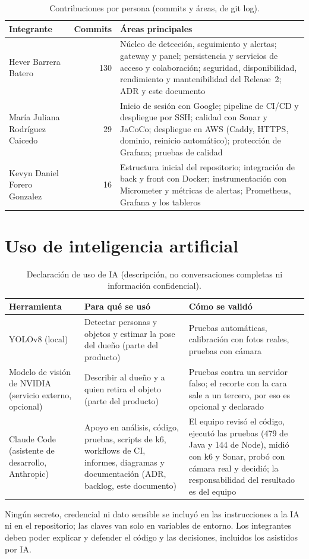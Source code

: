 \begin{table}[H]
\centering\small
\caption{Contribuciones por persona (commits y áreas, de git log).}\label{tab:contribuciones}
\begin{tabularx}{\textwidth}{lrY}
\toprule
\textbf{Integrante} & \textbf{Commits} & \textbf{Áreas principales} \\
\midrule
Hever Barrera Batero & 130 & Núcleo de detección, seguimiento y alertas; gateway y panel; persistencia y servicios de acceso y colaboración; seguridad, disponibilidad, rendimiento y mantenibilidad del Release~2; ADR y este documento \\
María Juliana Rodríguez Caicedo & 29 & Inicio de sesión con Google; pipeline de CI/CD y despliegue por SSH; calidad con Sonar y JaCoCo; despliegue en AWS (Caddy, HTTPS, dominio, reinicio automático); protección de Grafana; pruebas de calidad \\
Kevyn Daniel Forero Gonzalez & 16 & Estructura inicial del repositorio; integración de back y front con Docker; instrumentación con Micrometer y métricas de alertas; Prometheus, Grafana y los tableros \\
\bottomrule
\end{tabularx}
\end{table}

\section{Uso de inteligencia artificial}
\begin{table}[H]
\centering\small
\caption{Declaración de uso de IA (descripción, no conversaciones completas ni información confidencial).}\label{tab:ia}
\begin{tabularx}{\textwidth}{lYY}
\toprule
\textbf{Herramienta} & \textbf{Para qué se usó} & \textbf{Cómo se validó} \\
\midrule
YOLOv8 (local) & Detectar personas y objetos y estimar la pose del dueño (parte del producto) & Pruebas automáticas, calibración con fotos reales, pruebas con cámara \\
Modelo de visión de NVIDIA (servicio externo, opcional) & Describir al dueño y a quien retira el objeto (parte del producto) & Pruebas contra un servidor falso; el recorte con la cara sale a un tercero, por eso es opcional y declarado \\
Claude Code (asistente de desarrollo, Anthropic) & Apoyo en análisis, código, pruebas, scripts de k6, workflows de CI, informes, diagramas y documentación (ADR, backlog, este documento) & El equipo revisó el código, ejecutó las pruebas (479 de Java y 144 de Node), midió con k6 y Sonar, probó con cámara real y decidió; la responsabilidad del resultado es del equipo \\
\bottomrule
\end{tabularx}
\end{table}

Ningún secreto, credencial ni dato sensible se incluyó en las instrucciones a la IA ni en el repositorio; las claves van solo en variables de
entorno. Los integrantes deben poder explicar y defender el código y las decisiones, incluidos los asistidos por IA.
